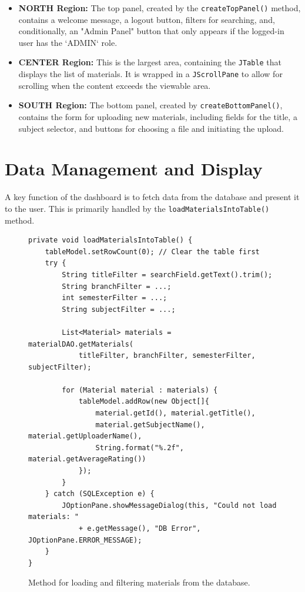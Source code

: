 \documentclass[12pt, a4paper]{report}
\begin{document}
\begin{itemize}
\begin{itemize}
    \item \textbf{NORTH Region:} The top panel, created by the \texttt{createTopPanel()} method, contains a welcome message, a logout button, filters for searching, and, conditionally, an "Admin Panel" button that only appears if the logged-in user has the `ADMIN` role.
    \item \textbf{CENTER Region:} This is the largest area, containing the \texttt{JTable} that displays the list of materials. It is wrapped in a \texttt{JScrollPane} to allow for scrolling when the content exceeds the viewable area.
    \item \textbf{SOUTH Region:} The bottom panel, created by \texttt{createBottomPanel()}, contains the form for uploading new materials, including fields for the title, a subject selector, and buttons for choosing a file and initiating the upload.
\end{itemize}

\section{Data Management and Display}
A key function of the dashboard is to fetch data from the database and present it to the user. This is primarily handled by the \texttt{loadMaterialsIntoTable()} method.

\begin{figure}[h!]
\begin{verbatim}
private void loadMaterialsIntoTable() {
    tableModel.setRowCount(0); // Clear the table first
    try {
        String titleFilter = searchField.getText().trim();
        String branchFilter = ...;
        int semesterFilter = ...;
        String subjectFilter = ...;

        List<Material> materials = materialDAO.getMaterials(
            titleFilter, branchFilter, semesterFilter, subjectFilter);
            
        for (Material material : materials) {
            tableModel.addRow(new Object[]{
                material.getId(), material.getTitle(), 
                material.getSubjectName(), material.getUploaderName(), 
                String.format("%.2f", material.getAverageRating())
            });
        }
    } catch (SQLException e) {
        JOptionPane.showMessageDialog(this, "Could not load materials: " 
            + e.getMessage(), "DB Error", JOptionPane.ERROR_MESSAGE);
    }
}
\end{verbatim}
\caption{Method for loading and filtering materials from the database.}
\label{fig:load_materials}
\end{figure}


\end{itemize}
\end{document}
